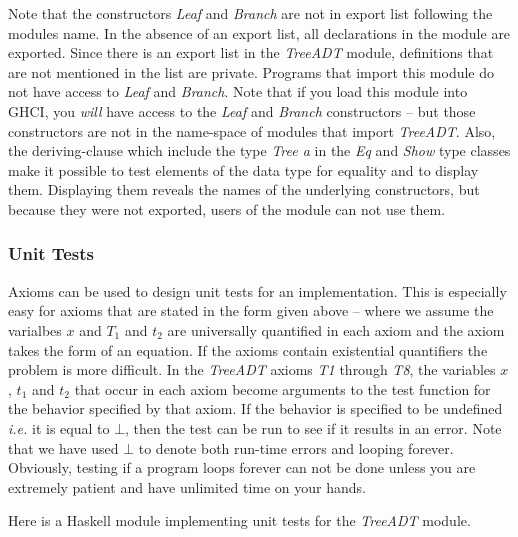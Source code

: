 \documentclass[11pt]{article}
\begin{document}
Note that the constructors {\it{Leaf}} and {\it{Branch}} are not in export list
following the modules name.  In the absence of an export list, all declarations
in the module are exported.  Since there is an export list in the
{\em{TreeADT}} module, definitions that are not mentioned in the list are
private.  Programs that import this module do not have access to {\it{Leaf}}
and {\it{Branch}}.  Note that if you load this module into GHCI, you
{\em{will}} have access to the {\em{Leaf}} and {\em{Branch}} constructors --
but those constructors are not in the name-space of modules that import
{\em{TreeADT}}.  Also, the deriving-clause which include the type {\it{Tree a}}
in the {\it{Eq}} and {\it{Show}} type classes make it possible to test elements
of the data type for equality and to display them.  Displaying them reveals the
names of the underlying constructors, but because they were not exported, users
of the module can not use them.

\subsubsection{Unit Tests}

Axioms can be used to design unit tests for an implementation.  This is
especially easy for axioms that are stated in the form given above -- where we
assume the varialbes $x$ and $T_1$ and $t_2$ are universally quantified in each
axiom and the axiom takes the form of an equation.  If the axioms contain
existential quantifiers the problem is more difficult.  In the {\em{TreeADT}}
axioms {\it{T1}} through {\it{T8}}, the variables $x$, $t_1$ and $t_2$ that
occur in each axiom become arguments to the test function for the behavior
specified by that axiom.  If the behavior is specified to be undefined
{\em{i.e.}} it is equal to $\bot$, then the test can be run to see if it
results in an error.  Note that we have used $\bot$ to denote both run-time
errors and looping forever. Obviously, testing if a program loops forever can
not be done unless you are extremely patient and have unlimited time on your
hands.

Here is a Haskell module implementing unit tests for the {\em{TreeADT}} module.
\end{document}
